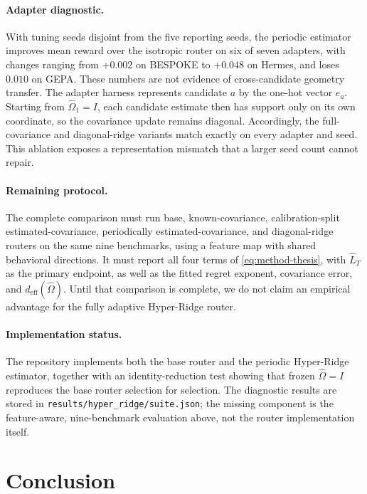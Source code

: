 \documentclass{article} %
\begin{document}
\paragraph{Adapter diagnostic.}
With tuning seeds disjoint from the five reporting seeds, the periodic estimator improves mean reward over the isotropic router on six of seven adapters, with changes ranging from $+0.002$ on BESPOKE to $+0.048$ on Hermes, and loses $0.010$ on GEPA. These numbers are not evidence of cross-candidate geometry transfer. The adapter harness represents candidate $a$ by the one-hot vector $e_a$. Starting from $\widehat{\Omega}_1=I$, each candidate estimate then has support only on its own coordinate, so the covariance update remains diagonal. Accordingly, the full-covariance and diagonal-ridge variants match exactly on every adapter and seed. This ablation exposes a representation mismatch that a larger seed count cannot repair.

\paragraph{Remaining protocol.}
The complete comparison must run base, known-covariance, calibration-split estimated-covariance, periodically estimated-covariance, and diagonal-ridge routers on the same nine benchmarks, using a feature map with shared behavioral directions. It must report all four terms of \eqref{eq:method-thesis}, with $\widehat L_T$ as the primary endpoint, as well as the fitted regret exponent, covariance error, and $d_{\mathrm{eff}}(\widehat\Omega)$. Until that comparison is complete, we do not claim an empirical advantage for the fully adaptive Hyper-Ridge router.

\paragraph{Implementation status.}
The repository implements both the base router and the periodic Hyper-Ridge estimator, together with an identity-reduction test showing that frozen $\widehat{\Omega}=I$ reproduces the base router selection for selection. The diagnostic results are stored in \texttt{results/hyper\_ridge/suite.json}; the missing component is the feature-aware, nine-benchmark evaluation above, not the router implementation itself.

\section{Conclusion}
\end{document}
